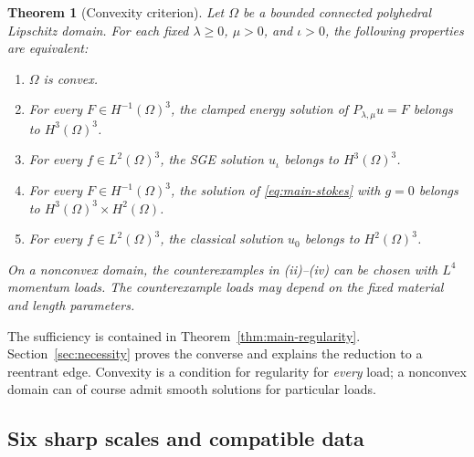 \documentclass[11pt,a4paper]{article}
\newtheorem{theorem}{Theorem}[section]
\theoremstyle{remark}
\numberwithin{equation}{section}
\begin{document}
\begin{theorem}[Convexity criterion]\label{thm:main-convexity}
Let \(\Omega\) be a bounded connected polyhedral Lipschitz domain.
For each fixed \(\lambda\ge0\), \(\mu>0\), and \(\iota>0\), the following
properties are equivalent:
\begin{enumerate}[label=\textup{(\roman*)}]
\item \(\Omega\) is convex.
\item For every \(F\in H^{-1}(\Omega)^3\), the clamped energy solution
of \(P_{\lambda,\mu}u=F\) belongs to \(H^3(\Omega)^3\).
\item For every \(f\in L^2(\Omega)^3\), the SGE solution
\(u_\iota\) belongs to \(H^3(\Omega)^3\).
\item For every \(F\in H^{-1}(\Omega)^3\), the solution of
\eqref{eq:main-stokes} with \(g=0\) belongs to
\(H^3(\Omega)^3\times H^2(\Omega)\).
\item For every \(f\in L^2(\Omega)^3\), the classical solution
\(u_0\) belongs to \(H^2(\Omega)^3\).
\end{enumerate}
On a nonconvex domain, the counterexamples in \textup{(ii)--(iv)}
can be chosen with \(L^4\) momentum loads. The counterexample loads may
depend on the fixed material and length parameters.
\end{theorem}

The sufficiency is contained in Theorem~\ref{thm:main-regularity}.
Section~\ref{sec:necessity} proves the converse and explains the reduction
to a reentrant edge. Convexity is a condition for regularity for
\emph{every} load; a nonconvex domain can of course admit smooth solutions
for particular loads.

\subsection{Six sharp scales and compatible data}
\end{document}
